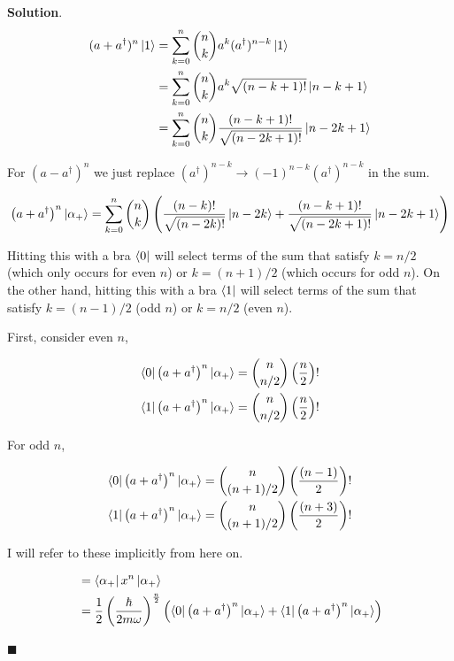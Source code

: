 \documentclass[12pt]{article}
\theoremstyle{definition}
\newenvironment{s}{%
        \begin{trivlist} \item \textbf{Solution}. }{%
            \hspace*{\fill} $\blacksquare$\end{trivlist}}%
\begin{document}
{\begin{s}
\begin{align*}
(a + a^{\dagger})^{n}\ket{1} &= \sum_{k=0}^{n}{n\choose k}a^{k}(a^{\dagger})^{n-k}\ket{1}\\
&= \sum_{k=0}^{n}{n\choose k}a^{k}\sqrt{(n-k+1)!}\ket{n-k+1}\\
&= \sum_{k=0}^{n}{n\choose k}\frac{(n-k+1)!}{\sqrt{(n-2k+1)!}}\ket{n-2k+1}\\
\end{align*}

For $(a-a^{\dagger})^{n}$ we just replace $(a^{\dagger})^{n-k} \rightarrow (-1)^{n-k}(a^{\dagger})^{n-k}$ in the sum.

\begin{align*}
\left(a+a^{\dagger}\right)^{n}\ket{\alpha_{+}} = \sum_{k=0}^{n}{n\choose k}\left(\frac{(n-k)!}{\sqrt{(n-2k)!}}\ket{n-2k}+\frac{(n-k+1)!}{\sqrt{(n-2k+1)!}}\ket{n-2k+1}\right)\\
\end{align*}

Hitting this with a bra $\bra{0}$ will select terms of the sum that satisfy $k = n/2$ (which only occurs for even $n$) or $k = (n+1)/2$ (which occurs for odd $n$). On the other hand, hitting this with a bra $\bra{1}$ will select terms of the sum that satisfy $k = (n-1)/2$ (odd $n$) or $k = n/2$ (even $n$). 

First, consider even $n$, 

\begin{align*}
\bra{0}\left(a+a^{\dagger}\right)^{n}\ket{\alpha_{+}} = {n\choose n/2}\left(\frac{n}{2}\right)!\\
\bra{1}\left(a+a^{\dagger}\right)^{n}\ket{\alpha_{+}} = {n\choose n/2}\left(\frac{n}{2}\right)!
\end{align*}

For odd $n$, 

\begin{align*}
\bra{0}\left(a+a^{\dagger}\right)^{n}\ket{\alpha_{+}} = {n\choose (n+1)/2}\left(\frac{(n-1)}{2}\right)!\\
\bra{1}\left(a+a^{\dagger}\right)^{n}\ket{\alpha_{+}} = {n\choose (n+1)/2}\left(\frac{(n+3)}{2}\right)!
\end{align*}

I will refer to these implicitly from here on.

\begin{align*}
[x^{n}] &= \bra{\alpha_{+}}x^{n}\ket{\alpha_{+}}\\
&= \frac{1}{2}\left(\frac{\hbar}{2m\omega}\right)^{\frac{n}{2}}\left(\bra{0}\left(a+a^{\dagger}\right)^{n}\ket{\alpha_{+}} + \bra{1}\left(a+a^{\dagger}\right)^{n}\ket{\alpha_{+}}\right)\\
\end{align*}


\end{s}}
\end{document}
